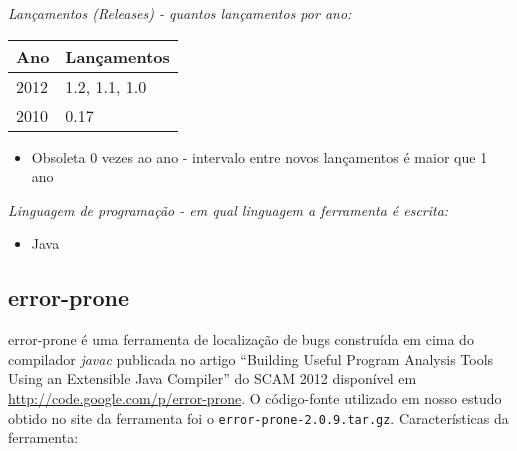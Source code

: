 \begin{description}

  \item {\it Lançamentos ({\it Releases}) - quantos lançamentos por ano:}
    \begin{table}[h!]
      \centering
      \begin{tabular}{| l | l |}
        \hline
        Ano  & Lançamentos    \\
        \hline
        2012 & 1.2, 1.1, 1.0  \\
        2010 & 0.17           \\
        \hline
      \end{tabular}
    \end{table}
    \begin{itemize}
      \item Obsoleta 0 vezes ao ano - intervalo entre novos lançamentos é maior que 1 ano
    \end{itemize}

  \item {\it Linguagem de programação - em qual linguagem a ferramenta é escrita:}
    \begin{itemize}
      \item Java
    \end{itemize}

\end{description}

\subsection{error-prone}

error-prone é uma ferramenta de localização de bugs construída em cima do
compilador {\it javac} publicada no artigo ``Building Useful Program Analysis
Tools Using an Extensible Java Compiler'' do SCAM 2012 disponível em
\url{http://code.google.com/p/error-prone}. O código-fonte utilizado em nosso
estudo obtido no site da ferramenta foi o \texttt{error-prone-2.0.9.tar.gz}.
Características da ferramenta:

